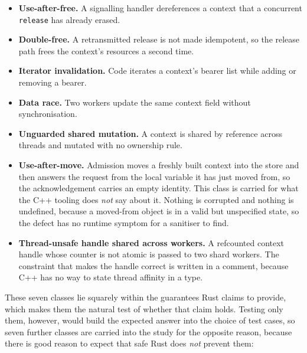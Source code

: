 \documentclass[english,oneside,a4paper,censored,csm,software-track-2020]{HYthesisML}
\begin{document}
\begin{itemize}
  \item \textbf{Use-after-free.} A signalling handler dereferences a context that a concurrent
        \texttt{release} has already erased.
  \item \textbf{Double-free.} A retransmitted release is not made idempotent, so the release
        path frees the context's resources a second time.
  \item \textbf{Iterator invalidation.} Code iterates a context's bearer list while adding or
        removing a bearer.
  \item \textbf{Data race.} Two workers update the same context field without synchronisation.
  \item \textbf{Unguarded shared mutation.} A context is shared by reference across threads and
        mutated with no ownership rule.
  \item \textbf{Use-after-move.} Admission moves a freshly built context into the store and
        then answers the request from the local variable it has just moved from, so the
        acknowledgement carries an empty identity. This class is carried for what the C++
        tooling does \emph{not} say about it. Nothing is corrupted and nothing is undefined,
        because a moved-from object is in a valid but unspecified state, so the defect has no
        runtime symptom for a sanitiser to find.
  \item \textbf{Thread-unsafe handle shared across workers.} A refcounted context handle whose
        counter is not atomic is passed to two shard workers. The constraint that makes the
        handle correct is written in a comment, because C++ has no way to state thread affinity
        in a type.
\end{itemize}

These seven classes lie squarely within the guarantees Rust claims to provide, which makes them
the natural test of whether that claim holds. Testing only them, however, would build the
expected answer into the choice of test cases, so seven further classes are carried into the
study for the opposite reason, because there is good reason to expect that safe Rust does
\emph{not} prevent them:
\end{document}
